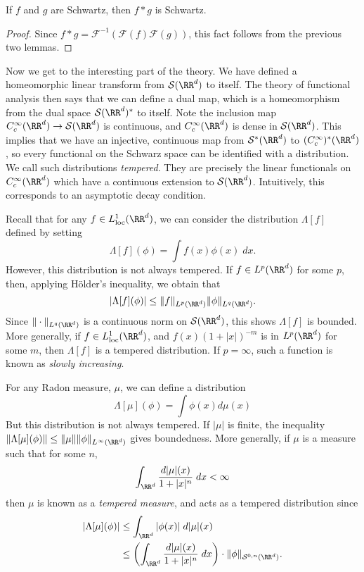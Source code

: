 \begin{corollary}
    If $f$ and $g$ are Schwartz, then $f * g$ is Schwartz.
\end{corollary}
\begin{proof}
    Since $f * g = \mathcal{F}^{-1}(\mathcal{F}(f) \mathcal{F}(g))$, this fact follows from the previous two lemmas.
\end{proof}

Now we get to the interesting part of the theory. We have defined a homeomorphic linear transform from $\mathcal{S}(\RR^d)$ to itself. The theory of functional analysis then says that we can define a dual map, which is a homeomorphism from the dual space $\mathcal{S}(\RR^d)^*$ to itself. Note the inclusion map $C_c^\infty(\RR^d) \to \mathcal{S}(\RR^d)$ is continuous, and $C_c^\infty(\RR^d)$ is dense in $\mathcal{S}(\RR^d)$. This implies that we have an injective, continuous map from $\mathcal{S}^*(\RR^d)$ to $(C_c^\infty)^*(\RR^d)$, so every functional on the Schwarz space can be identified with a distribution. We call such distributions \emph{tempered}. They are precisely the linear functionals on $C_c^\infty(\RR^d)$ which have a continuous extension to $\mathcal{S}(\RR^d)$. Intuitively, this corresponds to an asymptotic decay condition.

\begin{example}
    Recall that for any $f \in L^1_{\text{loc}}(\RR^d)$, we can consider the distribution $\Lambda[f]$ defined by setting
    \[ \Lambda[f](\phi) = \int f(x) \phi(x)\; dx. \]
    However, this distribution is not always tempered. If $f \in L^p(\RR^d)$ for some $p$, then, applying H\"{o}lder's inequality, we obtain that
    \[ |\Lambda[f](\phi)| \leq \| f \|_{L^p(\RR^d)} \| \phi \|_{L^q(\RR^d)}. \]
    Since $\| \cdot \|_{L^q(\RR^d)}$ is a continuous norm on $\mathcal{S}(\RR^d)$, this shows $\Lambda[f]$ is bounded. More generally, if $f \in L^1_{\text{loc}}(\RR^d)$, and $f(x) (1 + |x|)^{-m}$ is in $L^p(\RR^d)$ for some $m$, then $\Lambda[f]$ is a tempered distribution. If $p = \infty$, such a function is known as \emph{slowly increasing}.
\end{example}

\begin{example}
    For any Radon measure, $\mu$, we can define a distribution
    \[ \Lambda[\mu](\phi) = \int \phi(x) d\mu(x) \]
    But this distribution is not always tempered. If $|\mu|$ is finite, the inequality $\| \Lambda[\mu](\phi) \| \leq \| \mu \| \| \phi \|_{L^\infty(\RR^d)}$ gives boundedness. More generally, if $\mu$ is a measure such that for some $n$,
    \[ \int_{\RR^d} \frac{d|\mu|(x)}{1 + |x|^n}\; dx < \infty \]
    then $\mu$ is known as a \emph{tempered measure}, and acts as a tempered distribution since
    \begin{align*}
      |\Lambda[\mu](\phi)| &\leq \int_{\RR^d} |\phi(x)|\; d|\mu|(x)\\
      &\leq \left( \int_{\RR^d} \frac{d|\mu|(x)}{1 + |x|^n}\; dx \right) \cdot \| \phi \|_{\mathcal{S}^{0,n}(\RR^d)}.
    \end{align*}
\end{example}

